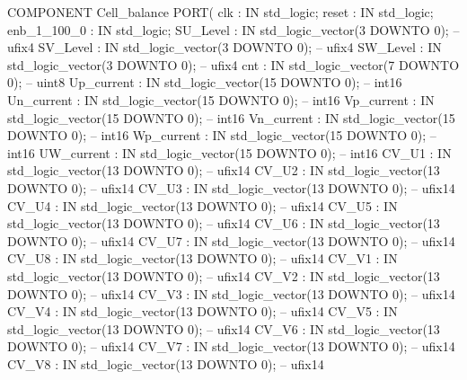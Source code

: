 \begin{mylisting}[language=VHDL,caption=MSSRDCDB制御\&SVPWMモジュール,label=appF_Control_top2_module_VHDL]
  COMPONENT Cell_balance
    PORT( clk                             :   IN    std_logic;
          reset                           :   IN    std_logic;
          enb_1_100_0                     :   IN    std_logic;
          SU_Level                        :   IN    std_logic_vector(3 DOWNTO 0);  -- ufix4
          SV_Level                        :   IN    std_logic_vector(3 DOWNTO 0);  -- ufix4
          SW_Level                        :   IN    std_logic_vector(3 DOWNTO 0);  -- ufix4
          cnt                             :   IN    std_logic_vector(7 DOWNTO 0);  -- uint8
          Up_current                      :   IN    std_logic_vector(15 DOWNTO 0);  -- int16
          Un_current                      :   IN    std_logic_vector(15 DOWNTO 0);  -- int16
          Vp_current                      :   IN    std_logic_vector(15 DOWNTO 0);  -- int16
          Vn_current                      :   IN    std_logic_vector(15 DOWNTO 0);  -- int16
          Wp_current                      :   IN    std_logic_vector(15 DOWNTO 0);  -- int16
          UW_current                      :   IN    std_logic_vector(15 DOWNTO 0);  -- int16
          CV_U1                           :   IN    std_logic_vector(13 DOWNTO 0);  -- ufix14
          CV_U2                           :   IN    std_logic_vector(13 DOWNTO 0);  -- ufix14
          CV_U3                           :   IN    std_logic_vector(13 DOWNTO 0);  -- ufix14
          CV_U4                           :   IN    std_logic_vector(13 DOWNTO 0);  -- ufix14
          CV_U5                           :   IN    std_logic_vector(13 DOWNTO 0);  -- ufix14
          CV_U6                           :   IN    std_logic_vector(13 DOWNTO 0);  -- ufix14
          CV_U7                           :   IN    std_logic_vector(13 DOWNTO 0);  -- ufix14
          CV_U8                           :   IN    std_logic_vector(13 DOWNTO 0);  -- ufix14
          CV_V1                           :   IN    std_logic_vector(13 DOWNTO 0);  -- ufix14
          CV_V2                           :   IN    std_logic_vector(13 DOWNTO 0);  -- ufix14
          CV_V3                           :   IN    std_logic_vector(13 DOWNTO 0);  -- ufix14
          CV_V4                           :   IN    std_logic_vector(13 DOWNTO 0);  -- ufix14
          CV_V5                           :   IN    std_logic_vector(13 DOWNTO 0);  -- ufix14
          CV_V6                           :   IN    std_logic_vector(13 DOWNTO 0);  -- ufix14
          CV_V7                           :   IN    std_logic_vector(13 DOWNTO 0);  -- ufix14
          CV_V8                           :   IN    std_logic_vector(13 DOWNTO 0);  -- ufix14

\end{mylisting}
